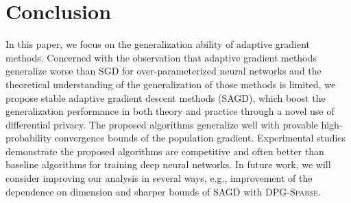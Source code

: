 \documentclass[11pt]{article}
\begin{document}
\vspace{-0.05in}
\section{Conclusion}\label{sec: conclusion}
\vspace{-0.05in}

In this paper, we focus on the generalization ability of adaptive gradient methods. Concerned with the 
observation that adaptive gradient methods generalize worse than SGD for over-parameterized neural networks and the theoretical understanding of the generalization of those methods is limited,
we propose stable adaptive gradient descent methods (\textsc{SAGD}), which boost the generalization performance in both theory and practice through a novel use of differential privacy. The proposed algorithms generalize well with provable high-probability convergence bounds of the population gradient. Experimental studies demonstrate the proposed algorithms are competitive and often better than baseline algorithms for training deep neural networks. 
In future work, we will consider improving our analysis in several ways, e.g.,  improvement of the dependence on dimension and sharper bounds of \textsc{SAGD} with \textsc{DPG-Sparse}.



\clearpage




\clearpage


\appendix


\end{document}
